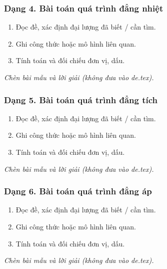 \subsubsection{Dạng 4. Bài toán quá trình đẳng nhiệt}
\begin{phuongphap}
\begin{enumerate}
\item Đọc đề, xác định đại lượng đã biết / cần tìm.
\item Ghi công thức hoặc mô hình liên quan.
\item Tính toán và đối chiếu đơn vị, dấu.
\end{enumerate}
\end{phuongphap}
\begin{vidumau}
\textit{Chèn bài mẫu và lời giải (không đưa vào de.tex).}
\end{vidumau}

\subsubsection{Dạng 5. Bài toán quá trình đẳng tích}
\begin{phuongphap}
\begin{enumerate}
\item Đọc đề, xác định đại lượng đã biết / cần tìm.
\item Ghi công thức hoặc mô hình liên quan.
\item Tính toán và đối chiếu đơn vị, dấu.
\end{enumerate}
\end{phuongphap}
\begin{vidumau}
\textit{Chèn bài mẫu và lời giải (không đưa vào de.tex).}
\end{vidumau}

\subsubsection{Dạng 6. Bài toán quá trình đẳng áp}
\begin{phuongphap}
\begin{enumerate}
\item Đọc đề, xác định đại lượng đã biết / cần tìm.
\item Ghi công thức hoặc mô hình liên quan.
\item Tính toán và đối chiếu đơn vị, dấu.
\end{enumerate}
\end{phuongphap}
\begin{vidumau}
\textit{Chèn bài mẫu và lời giải (không đưa vào de.tex).}
\end{vidumau}

